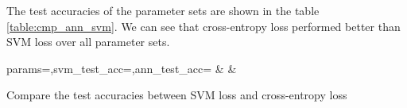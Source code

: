 \documentclass[12pt]{article}
\begin{document}
The test accuracies of the parameter sets are shown in the table \ref{table:cmp_ann_svm}.
We can see that cross-entropy loss performed better than SVM loss over all parameter sets.

\begin{table}
    \centering
    {params=\params,svm_test_acc=\svm,ann_test_acc=\ann}
    {\params & \svm & \ann}
    \caption{Compare the test accuracies between SVM loss and cross-entropy loss}
    \label{table:cmp_ann_svm}
\end{table}
\end{document}
